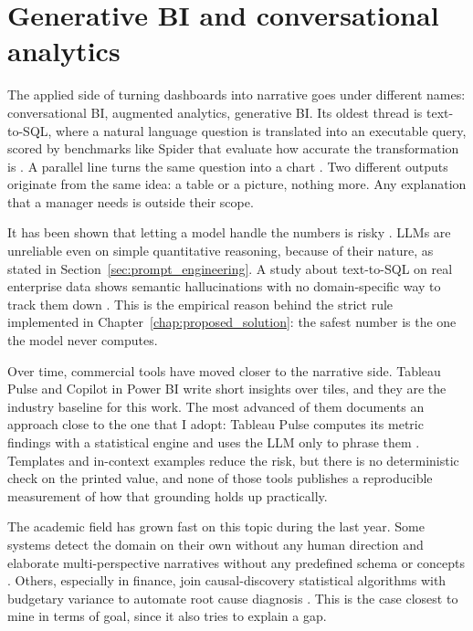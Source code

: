 \documentclass[12pt,a4paper,openright,twoside]{book}
\begin{document}
\section{Generative BI and conversational analytics}
The applied side of turning dashboards into narrative goes under different names: conversational \ac{BI}, augmented analytics, generative \ac{BI}.
Its oldest thread is text-to-\ac{SQL}, where a natural language question is translated into an executable query, scored by benchmarks like Spider that evaluate how accurate the transformation is \cite{yu2018spider}. 
A parallel line turns the same question into a chart \cite{shen2023nl2vis}. 
Two different outputs originate from the same idea: a table or a picture, nothing more. Any explanation that a manager needs is outside their scope.

It has been shown that letting a model handle the numbers is risky \cite{wu2024statisticians}.
\acp{LLM} are unreliable even on simple quantitative reasoning, because of their nature, as stated in Section~\ref{sec:prompt_engineering}.
A study about text-to-\ac{SQL} on real enterprise data shows semantic hallucinations with no domain-specific way to track them down \cite{choi2025factconsistency}.
This is the empirical reason behind the strict rule implemented in Chapter~\ref{chap:proposed_solution}: the safest number is the one the model never computes.

Over time, commercial tools have moved closer to the narrative side.
Tableau Pulse \cite{tableau2024pulse} and Copilot in Power BI \cite{microsoft2024copilot} write short insights over tiles, and they are the industry baseline for this work.
The most advanced of them documents an approach close to the one that I adopt: Tableau Pulse computes its metric findings with a statistical engine and uses the \ac{LLM} only to phrase them \cite{tableau2024insights,salesforce2024pulsesummary}.
Templates and in-context examples reduce the risk, but there is no deterministic check on the printed value, and none of those tools publishes a reproducible measurement of how that grounding holds up practically.

The academic field has grown fast on this topic during the last year.
Some systems detect the domain on their own without any human direction and elaborate multi-perspective narratives without any predefined schema or concepts \cite{zhang2025datadash}.
Others, especially in finance, join causal-discovery statistical algorithms with budgetary variance to automate root cause diagnosis \cite{chen2026causalvariance}. This is the case closest to mine in terms of goal, since it also tries to explain a gap.
\end{document}
